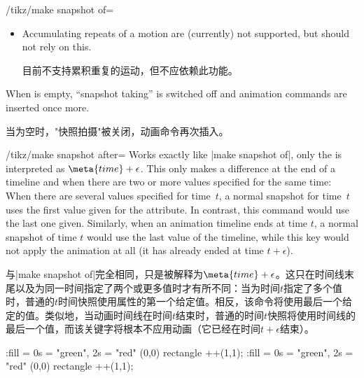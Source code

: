 \begin{key}{/tikz/make snapshot of=}
\begin{itemize}
        \item Accumulating repeats of a motion are (currently) not supported,
            but should not rely on this.

            目前不支持累积重复的运动，但不应依赖此功能。


    \end{itemize}

    When  is empty, ``snapshot taking'' is switched off and
    animation commands are inserted once more.

    当为空时，"快照拍摄"被关闭，动画命令再次插入。


\end{key}

\begin{key}{/tikz/make snapshot after=}
    Works exactly like |make snapshot of|, only the  is interpreted
    as $\meta{time} + \epsilon$. This only makes a difference at the end of a
    timeline and when there are two or more values specified for the same time:
    When there are several values specified for time~$t$, a normal snapshot for
    time~$t$ uses the first value given for the attribute. In contrast, this
    command would use the last one given. Similarly, when an animation timeline
    ends at time $t$, a normal snapshot of time $t$ would use the last value of
    the timeline, while this key would not apply the animation at all (it has
    already ended at time $t + \epsilon$).
    
    与|make snapshot of|完全相同，只是被解释为$\meta{time} + \epsilon$。这只在时间线末尾以及为同一时间指定了两个或更多值时才有所不同：当为时间$t$指定了多个值时，普通的$t$时间快照使用属性的第一个给定值。相反，该命令将使用最后一个给定的值。类似地，当动画时间线在时间$t$结束时，普通的时间$t$快照将使用时间线的最后一个值，而该关键字将根本不应用动画（它已经在时间$t + \epsilon$结束）。


\begin{codeexample}[preamble={\usetikzlibrary{animations}}]
\tikz [make snapshot of = 2s]
  \fill :fill = { 0s = "green", 2s = "red" } (0,0) rectangle ++(1,1);
\tikz [make snapshot after = 2s]
  \fill :fill = { 0s = "green", 2s = "red" } (0,0) rectangle ++(1,1);
\end{codeexample}
\end{key}


